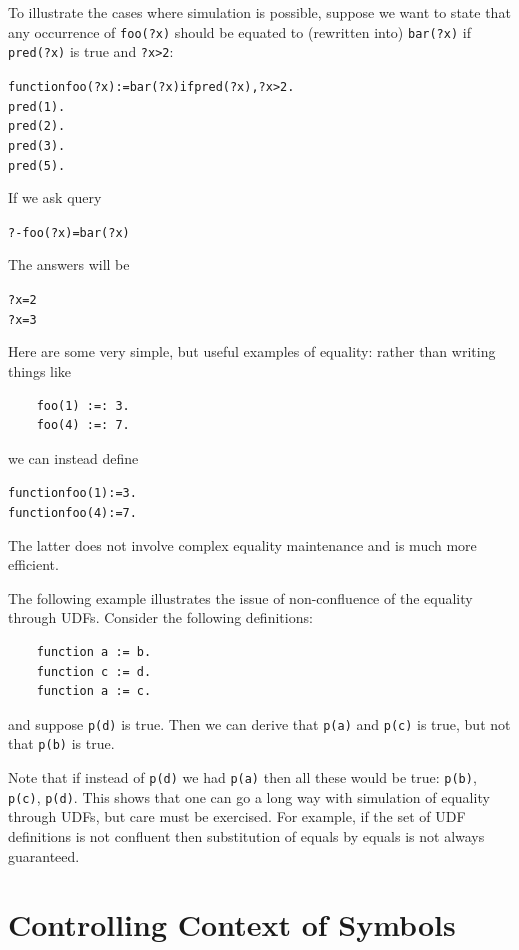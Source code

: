 \documentclass[11pt]{article}
\begin{document}
To illustrate the cases where simulation is possible, suppose we want to
state that any occurrence of \texttt{foo(?x)} should be equated to (rewritten
into) \texttt{bar(?x)} if \texttt{pred(?x)} is true and \texttt{?x>2}: 
\begin{alltt}
    function foo(?x):=bar(?x) if  pred(?x), ?x>2.
    pred(1).
    pred(2).
    pred(3).
    pred(5).
\end{alltt}

If we ask query
\begin{alltt}
    ?- foo(?x)=bar(?x)
\end{alltt}
The answers will be
\begin{alltt}
    ?x=2
    ?x=3
\end{alltt}


Here are some very simple, but useful examples of equality: rather than
writing things like
\begin{verbatim}
    foo(1) :=: 3.
    foo(4) :=: 7.
\end{verbatim}
we can instead define
\begin{alltt}
    function foo(1):=3.
    function foo(4):=7.
\end{alltt}
The latter does not involve complex equality maintenance and is much more
efficient.

The following example illustrates the issue of non-confluence of the
equality through UDFs. Consider the following definitions:
\begin{verbatim}
    function a := b.
    function c := d.
    function a := c.
\end{verbatim}
and suppose \texttt{p(d)} is true. Then we can derive that \texttt{p(a)}
and \texttt{p(c)} is true, but not that \texttt{p(b)} is true.    

Note that if instead of \texttt{p(d)} we had \texttt{p(a)} then all these
would be true: \texttt{p(b)}, \texttt{p(c)}, \texttt{p(d)}.
This shows that one can go a long way
with simulation of equality through UDFs, but care must be exercised.
For example, if the set of UDF definitions is not confluent then
substitution of equals by equals is not always guaranteed.


\section{Controlling Context of Symbols} \label{sec:symbol}

\end{document}
